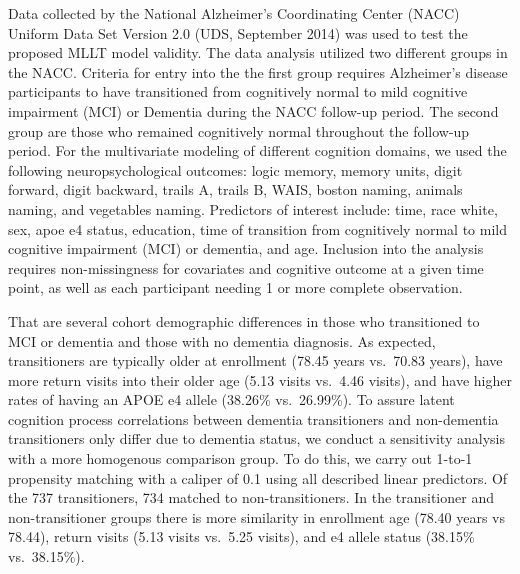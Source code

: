 \documentclass[
]{article}
\begin{document}
Data collected by the National Alzheimer's Coordinating Center (NACC) Uniform Data Set Version 2.0 (UDS, September 2014) was used to test the proposed MLLT model validity. The data analysis utilized two different groups in the NACC. Criteria for entry into the the first group requires Alzheimer's disease participants to have transitioned from cognitively normal to mild cognitive impairment (MCI) or Dementia during the NACC follow-up period. The second group are those who remained cognitively normal throughout the follow-up period. For the multivariate modeling of different cognition domains, we used the following neuropsychological outcomes: logic memory, memory units, digit forward, digit backward, trails A, trails B, WAIS, boston naming, animals naming, and vegetables naming. Predictors of interest include: time, race white, sex, apoe e4 status, education, time of transition from cognitively normal to mild cognitive impairment (MCI) or dementia, and age. Inclusion into the analysis requires non-missingness for covariates and cognitive outcome at a given time point, as well as each participant needing 1 or more complete observation.

That are several cohort demographic differences in those who transitioned to MCI or dementia and those with no dementia diagnosis. As expected, transitioners are typically older at enrollment (78.45 years vs.~70.83 years), have more return visits into their older age (5.13 visits vs.~4.46 visits), and have higher rates of having an APOE e4 allele (38.26\% vs.~26.99\%). To assure latent cognition process correlations between dementia transitioners and non-dementia transitioners only differ due to dementia status, we conduct a sensitivity analysis with a more homogenous comparison group. To do this, we carry out 1-to-1 propensity matching with a caliper of 0.1 using all described linear predictors. Of the 737 transitioners, 734 matched to non-transitioners. In the transitioner and non-transitioner groups there is more similarity in enrollment age (78.40 years vs 78.44), return visits (5.13 visits vs.~5.25 visits), and e4 allele status (38.15\% vs.~38.15\%).
\end{document}
